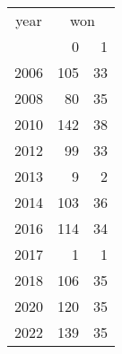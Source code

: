 \footnotesize\begin{tabular}[t]{lrr}
\toprule
\multicolumn{1}{c}{year} & \multicolumn{2}{c}{won} \\
\cmidrule(l{3pt}r{3pt}){1-1} \cmidrule(l{3pt}r{3pt}){2-3}
  & 0 & 1\\
\midrule
2006 & 105 & 33\\
2008 & 80 & 35\\
2010 & 142 & 38\\
2012 & 99 & 33\\
2013 & 9 & 2\\
2014 & 103 & 36\\
2016 & 114 & 34\\
2017 & 1 & 1\\
2018 & 106 & 35\\
2020 & 120 & 35\\
2022 & 139 & 35\\
\bottomrule
\end{tabular}
